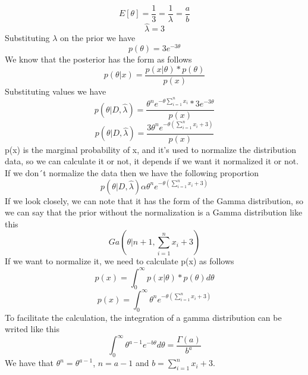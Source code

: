 \documentclass[conference, onecolumn]{IEEEtran}
\begin{document}
\begin{itemize}
\begin{itemize}
			\begin{equation}
				E[\theta] = \frac{1}{3} = \frac{1}{\lambda} =\frac{a}{b}
			\end{equation}
			\begin{equation}
				\hat{\lambda} = 3
			\end{equation}
			Substituting $\lambda$ on the prior we have
			\begin{equation}
				p(\theta) = 3e^{-3\theta}
			\end{equation}
			We know that the posterior has the form as follows
			\begin{equation}
				p(\theta|x) = \frac{p(x|\theta) * p(\theta)}{p(x)}
			\end{equation}
			Substituting values we have
			\begin{equation}
				p(\theta|D,\hat{\lambda}) = \frac{\theta^n e^{- \theta\sum_{i=1}^{n}x_i} * 3e^{-3\theta}}{p(x)}
			\end{equation}
			\begin{equation}
				p(\theta|D,\hat{\lambda}) = \frac{3\theta^n e^{- \theta (\sum_{i=1}^{n} x_i + 3)}}{p(x)}
			\end{equation}
			p(x) is the marginal probability of x, and it's used to normalize the distribution data, so we can calculate it or not, it depends if we want it normalized it or not. If we don´t normalize the data then we have the following proportion
			\begin{equation}
				p(\theta|D,\hat{\lambda}) \alpha \theta^n e^{- \theta (\sum_{i=1}^{n} x_i + 3)}
			\end{equation}
			If we look closely, we can note that it has the form of the Gamma distribution, so we can say that the prior without the normalization is a Gamma distribution like this
			\begin{equation}
				Ga(\theta|n+1, \sum_{i=1}^{n} x_i + 3)
			\end{equation}
			If we want to normalize it, we need to calculate p(x) as follows
			\begin{equation}
				p(x) = \int_{0}^{\infty} p(x|\theta) * p(\theta) d\theta
			\end{equation}
			\begin{equation}
				p(x) = \int_{0}^{\infty} \theta^n e^{- \theta (\sum_{i=1}^{n}x_i + 3)}
			\end{equation}
			To facilitate the calculation, the integration of a gamma distribution can be writed like this
			\begin{equation}
				\int_{0}^{\infty} \theta^{a - 1} e^{-b\theta} d\theta = \frac{\Gamma(a)}{b^a}
			\end{equation}
			We have that $\theta^n = \theta^{a - 1}$, $n=a-1$ and $b=\sum_{i=1}^{n} x_i + 3$.
			

\end{itemize}
\end{itemize}
\end{document}
